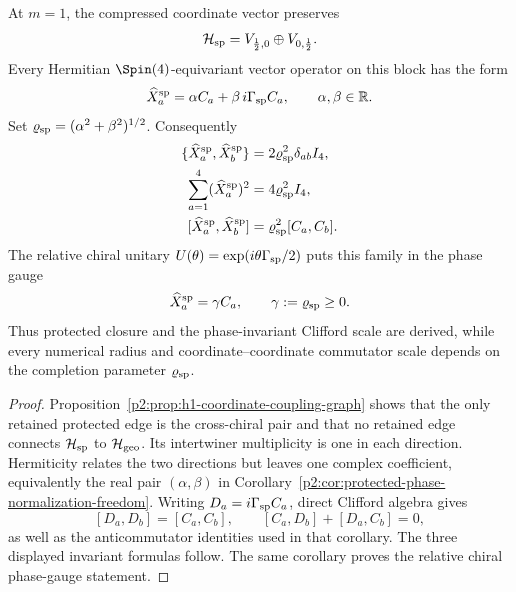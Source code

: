 \documentclass[12pt,a4paper]{article}
\begin{document}
\begin{theorem}
\label{p2:lem:minimal-spinor-block-closure}
\label{p2:lem:protected-vector-intertwiner-unique}
\label{p2:prop:equivariance-does-not-fix-protected-radius}
\label{p2:lem:protected-toeplitz-rme}
\label{p2:thm:position-operators}
\label{p2:thm:embedding-coordinate-operators}
\label{p2:prop:spinor-radius}
At \(m=1\), the compressed coordinate vector preserves
\[
\mathcal H_{\rm sp}
=
V_{\frac12,0}\oplus V_{0,\frac12}.
\]
Every Hermitian \(\Spin(4)\)-equivariant vector operator on this block has the
form
\begin{equation}
\label{p2:eq:protected-toeplitz-rme}
\widehat X_a^{\rm sp}
=\alpha C_a+\beta\,i\Gamma_{\rm sp}C_a,
\qquad
\alpha,\beta\in\mathbb R.
\end{equation}
Set \(\varrho_{\rm sp}=(\alpha^2+\beta^2)^{1/2}\).  Consequently
\begin{align}
\{\widehat X_a^{\rm sp},\widehat X_b^{\rm sp}\}
&=2\varrho_{\rm sp}^2\delta_{ab}I_4,\\
\sum_{a=1}^4(\widehat X_a^{\rm sp})^2
&=4\varrho_{\rm sp}^2I_4,
\label{p2:eq:protected-toeplitz-radius}\\
[\widehat X_a^{\rm sp},\widehat X_b^{\rm sp}]
&=\varrho_{\rm sp}^2[C_a,C_b].
\end{align}
The relative chiral unitary
\(U(\theta)=\exp(i\theta\Gamma_{\rm sp}/2)\) puts this family in the
phase gauge
\[
\widehat X_a^{\rm sp}=\gamma C_a,
\qquad
\gamma:=\varrho_{\rm sp}\ge0.
\]
Thus protected closure and the phase-invariant Clifford scale are derived,
while every numerical radius and coordinate--coordinate commutator scale
depends on the completion parameter \(\varrho_{\rm sp}\).
\end{theorem}

\begin{proof}
Proposition~\ref{p2:prop:h1-coordinate-coupling-graph} shows that the only
retained protected edge is the cross-chiral pair and that no retained edge
connects \(\mathcal H_{\rm sp}\) to \(\mathcal H_{\rm geo}\).  Its intertwiner
multiplicity is one in each direction.  Hermiticity relates the two
directions but leaves one complex coefficient, equivalently the real pair
\((\alpha,\beta)\) in
Corollary~\ref{p2:cor:protected-phase-normalization-freedom}.
Writing \(D_a=i\Gamma_{\rm sp}C_a\), direct Clifford algebra gives
\[
[D_a,D_b]=[C_a,C_b],
\qquad
[C_a,D_b]+[D_a,C_b]=0,
\]
as well as the anticommutator identities used in that corollary.  The three
displayed invariant formulas follow.  The same corollary proves the relative
chiral phase-gauge statement.
\end{proof}
\end{document}
